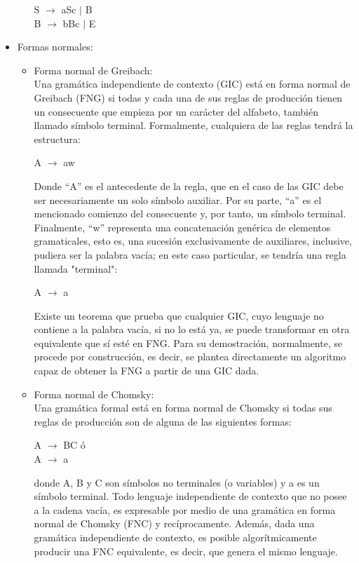 \documentclass[12pt,a4paper,spanish]{book}
\begin{document}
\begin{itemize}
\begin{enumerate}
    S  $\rightarrow$ aSc $\mid$ B\\
    B $\rightarrow$ bBc $\mid$ E\\
\end{enumerate}
\item Formas normales:\label{sec:normal}
\begin{itemize}
\item Forma normal de Greibach:\\
\newline
Una gram\'atica independiente de contexto (GIC) est\'a en forma normal de Greibach (FNG) si todas y cada una de sus reglas de producci\'on tienen un consecuente que empieza por un car\'acter del alfabeto, tambi\'en llamado s\'imbolo terminal. Formalmente, cualquiera de las reglas tendr\'a la estructura:\\
\begin{center}
A $\rightarrow$ aw
\end{center}
Donde ``A'' es el antecedente de la regla, que en el caso de las GIC debe ser necesariamente un solo s\'imbolo auxiliar. Por su parte, ``a'' es el mencionado comienzo del consecuente y, por tanto, un s\'imbolo terminal. Finalmente, ``w'' representa una concatenaci\'on gen\'erica de elementos gramaticales, esto es, una sucesi\'on exclusivamente de auxiliares, inclusive, pudiera ser la palabra vac\'ia; en este caso particular, se tendr\'ia una regla llamada "terminal":\\
\begin{center}
A $\rightarrow$ a
\end{center}
Existe un teorema que prueba que cualquier GIC, cuyo lenguaje no contiene a la palabra vac\'ia, si no lo est\'a ya, se puede transformar en otra equivalente que s\'i est\'e en FNG. Para su demostraci\'on, normalmente, se procede por construcci\'on, es decir, se plantea directamente un algoritmo capaz de obtener la FNG a partir de una GIC dada.\\
\item Forma normal de Chomsky:\\
\newline
Una gram\'atica formal est\'a en forma normal de Chomsky si todas sus reglas de producci\'on son de alguna de las siguientes formas:
\begin{center}
A $\rightarrow$ BC \'o\\ 
A $\rightarrow$ a\\
\end{center}
donde A, B y C son s\'imbolos no terminales (o variables) y a es un s\'imbolo terminal.
Todo lenguaje independiente de contexto que no posee a la cadena vac\'ia, es expresable por medio de una gram\'atica en forma normal de Chomsky (FNC) y rec\'iprocamente. Adem\'as, dada una gram\'atica independiente de contexto, es posible algor\'itmicamente producir una FNC equivalente, es decir, que genera el mismo lenguaje.
\end{itemize}
\end{itemize}
\end{document}
